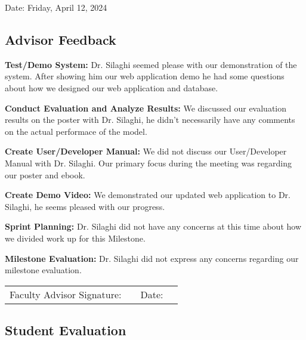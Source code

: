 \documentclass[12pt]{article}
\begin{document}
Date: Friday, April 12, 2024

\subsection{Advisor Feedback}


\noindent\textbf{Test/Demo System:} Dr. Silaghi seemed please with our demonstration of the system. After showing him our
web application demo he had some questions about how we designed our web application and database.

\medskip

\noindent\textbf{Conduct Evaluation and Analyze Results:} We discussed our evaluation results on the poster with Dr. Silaghi,
he didn't necessarily have any comments on the actual performace of the model.

\medskip

\noindent\textbf{Create User/Developer Manual:} We did not discuss our User/Developer Manual with Dr. Silaghi. Our primary focus
during the meeting was regarding our poster and ebook.

\medskip

\noindent\textbf{Create Demo Video:} We demonstrated our updated web application to Dr. Silaghi, he seems pleased with our progress.

\medskip

\noindent\textbf{Sprint Planning:} Dr. Silaghi did not have any concerns at this time about how we divided work up for this Milestone.
\medskip

\noindent\textbf{Milestone Evaluation:} Dr. Silaghi did not express any concerns regarding our milestone evaluation.

\bigskip

\begin{center}
\begin{tabular}{@{}p{1.9in}p{3in}p{.3in}p{1in}@{}}
  Faculty Advisor Signature: & \hrulefill & Date: & \hrulefill\\
\end{tabular}
\end{center}

\pagebreak

\subsection{Student Evaluation}
\end{document}
